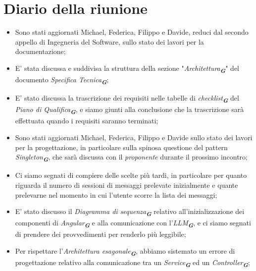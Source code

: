 
\section{Diario della riunione}

\begin{itemize}
    \item Sono stati aggiornati Michael, Federica, Filippo e Davide, reduci dal secondo appello di Ingegneria del Software, sullo
    stato dei lavori per la documentazione;
    \item E' stata discussa e suddivisa la struttura della sezione "\emph{Architettura}\textsubscript{\textit{\textbf{G}}}" del
    documento \emph{Specifica Tecnica}\textsubscript{\textit{\textbf{G}}};
    \item E' stato discussa la trascrizione dei requisiti nelle tabelle di \emph{checklist}\textsubscript{\textit{\textbf{G}}} del
    \emph{Piano di Qualifica}\textsubscript{\textit{\textbf{G}}}, e siamo giunti alla conclusione che la trascrizione sarà effettuata
    quando i requisiti saranno terminati;
    \item Sono stati aggiornati Michael, Federica, Filippo e Davide sullo stato dei lavori per la progettazione, in particolare sulla
    spinosa questione del pattern \emph{Singleton}\textsubscript{\textit{\textbf{G}}}, che sarà discussa con il \emph{proponente}
    durante il prossimo incontro;
    \item Ci siamo segnati di compiere delle scelte più tardi, in particolare per quanto riguarda il numero di sessioni di messaggi
    prelevate inizialmente e quante prelevarne nel momento in cui l'utente scorre la lista dei messaggi;
    \item E' stato discusso il \emph{Diagramma di sequenza}\textsubscript{\textit{\textbf{G}}} relativo all'inizializzazione dei
    componenti di \emph{Angular}\textsubscript{\textit{\textbf{G}}} e alla comunicazione con
    l'\emph{LLM}\textsubscript{\textit{\textbf{G}}}, e ci siamo segnati di prendere dei provvedimenti per renderlo più leggibile;
    \item Per rispettare l'\emph{Architettura esagonale}\textsubscript{\textit{\textbf{G}}}, abbiamo sistemato un errore di
    progettazione relativo alla comunicazione tra un \emph{Service}\textsubscript{\textit{\textbf{G}}} ed un
    \emph{Controller}\textsubscript{\textit{\textbf{G}}};

\end{itemize}

